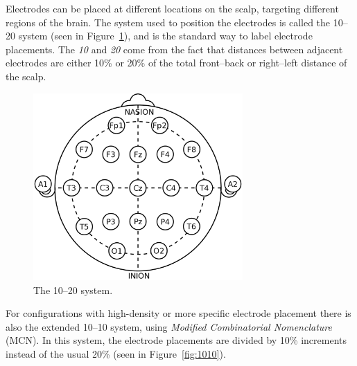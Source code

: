     Electrodes can be placed at different locations on the scalp, targeting different regions of the brain. The system used to position the electrodes is called the 10–20 system (seen in Figure~\ref{fig:1020}), and is the standard way to label electrode placements. The \emph{10} and \emph{20} come from the fact that distances between adjacent electrodes are either 10\% or 20\% of the total front–back or right–left distance of the scalp.

    \begin{figure}[h]
        \begin{center}
            \includegraphics[width=8cm]{img/1020system.png}
        \end{center}
        \caption{The 10–20 system.}\label{fig:1020}
    \end{figure}

    For configurations with high-density or more specific electrode placement there is also the extended 10--10 system, using \emph{Modified Combinatorial Nomenclature} (MCN). In this system, the electrode placements are divided by 10\% increments instead of the usual 20\% (seen in Figure~\ref{fig:1010}).

